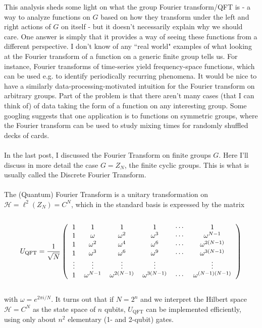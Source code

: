 \documentclass[]{article}
\begin{document}
This analysis sheds some light on what the group Fourier transform/QFT is - a way to analyze functions on $G$ based on how they transform under the left and right actions of $G$ on itself - but it doesn't necessarily explain why we should care. One answer is simply that it provides a way of seeing these functions from a different perspective. I don't know of any ``real world" examples of what looking at the Fourier transform of a function on a generic finite group tells us. For instance, Fourier transforms of time-series yield frequency-space functions, which can be used e.g. to identify periodically recurring phenomena. It would be nice to have a similarly data-processing-motivated intuition for the Fourier transform on arbitrary groups. Part of the problem is that there aren't many cases (that I can think of) of data taking the form of a function on any interesting group. Some googling suggests that one application is to functions on symmetric groups, where the Fourier transform can be used to study mixing times for randomly shuffled decks of cards.\\
\\
\noindent In the last post, I discussed the Fourier Transform on finite groups $G$. Here I'll discuss in more detail the case $G=Z_N$, the finite cyclic groups. This is what is usually called the Discrete Fourier Transform.\\
\\
The (Quantum) Fourier Transform is a unitary transformation on $\mathcal{H}=\ell^2(Z_N)=C^N$, which in the standard basis is expressed by the matrix\\
\\
\begin{equation}
U_\text{QFT}=\frac{1}{\sqrt{N}}\left(\begin{tabular}{cccccc}
$1$ & $1$ & $1$ & $1$ & $\cdots$& $1$\\
$1$ & $\omega$ & $\omega^2$ & $\omega^3$ & $\cdots$& $\omega^{N-1}$\\
$1$ & $\omega^2$ & $\omega^4$ & $\omega^6$& $\cdots$& $\omega^{2(N-1)}$\\
$1$ & $\omega^3$ & $\omega^6$ & $\omega^9$& $\cdots$& $\omega^{3(N-1)}$\\
$\vdots$ & $\vdots$ & $\vdots$ & $\vdots$& & $\vdots$\\
$1$ & $\omega^{N-1}$ & $\omega^{2(N-1)}$ & $\omega^{3(N-1)}$& $\cdots$& $\omega^{(N-1)(N-1)}$\\
\end{tabular}\right)
\end{equation}
\\
with $\omega=e^{2\pi i/N}$. It turns out that if $N=2^n$ and we interpret the Hilbert space $\mathcal{H}=C^N$ as the state space of $n$ qubits, $U_\text{QFT}$ can be implemented efficiently, using only about $n^2$ elementary (1- and 2-qubit) gates.
\end{document}
